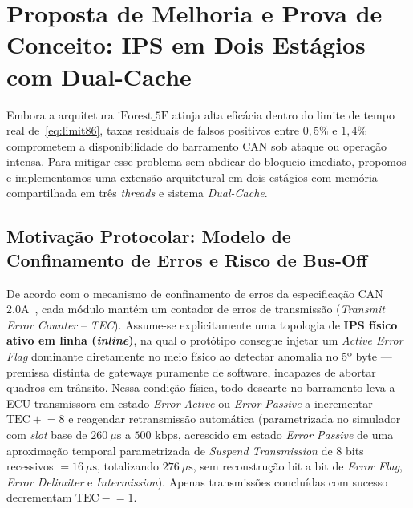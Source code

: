 \documentclass[conference]{IEEEtran}
\begin{document}
\section{Proposta de Melhoria e Prova de Conceito: IPS em Dois Estágios com Dual-Cache}

Embora a arquitetura $\text{iForest\_5F}$ atinja alta eficácia dentro do limite de tempo real de~\eqref{eq:limit86}, taxas residuais de falsos positivos entre $0{,}5\%$ e $1{,}4\%$ comprometem a disponibilidade do barramento CAN sob ataque ou operação intensa. Para mitigar esse problema sem abdicar do bloqueio imediato, propomos e implementamos uma extensão arquitetural em dois estágios com memória compartilhada em três \textit{threads} e sistema \textit{Dual-Cache}.

\subsection{Motivação Protocolar: Modelo de Confinamento de Erros e Risco de Bus-Off}
De acordo com o mecanismo de confinamento de erros da especificação CAN 2.0A~\cite{bosch1991can,kvaser_error}, cada módulo mantém um contador de erros de transmissão (\textit{Transmit Error Counter} -- \textit{TEC}). Assume-se explicitamente uma topologia de \textbf{IPS físico ativo em linha (\textit{inline})}, na qual o protótipo consegue injetar um \textit{Active Error Flag} dominante diretamente no meio físico ao detectar anomalia no 5º byte — premissa distinta de gateways puramente de software, incapazes de abortar quadros em trânsito. Nessa condição física, todo descarte no barramento leva a ECU transmissora em estado \textit{Error Active} ou \textit{Error Passive} a incrementar $\text{TEC} \mathrel{+}= 8$ e reagendar retransmissão automática (parametrizada no simulador com \textit{slot} base de $260~\mu\text{s}$ a $500\text{ kbps}$, acrescido em estado \textit{Error Passive} de uma aproximação temporal parametrizada de \textit{Suspend Transmission} de $8$ bits recessivos $= 16~\mu\text{s}$, totalizando $276~\mu\text{s}$, sem reconstrução bit a bit de \textit{Error Flag}, \textit{Error Delimiter} e \textit{Intermission}). Apenas transmissões concluídas com sucesso decrementam $\text{TEC} \mathrel{-}= 1$.
\end{document}

